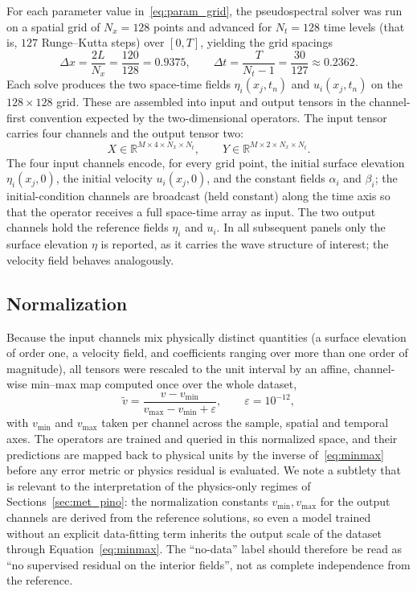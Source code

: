 For each parameter value in~\eqref{eq:param_grid}, the pseudospectral solver was run on a spatial grid of $N_x = 128$ points and advanced for $N_t = 128$ time levels (that is, $127$ Runge--Kutta steps) over $[0,T]$, yielding the grid spacings
\begin{equation}\label{eq:spacings}
    \Delta x = \frac{2L}{N_x} = \frac{120}{128} = 0.9375,
    \qquad
    \Delta t = \frac{T}{N_t - 1} = \frac{30}{127} \approx 0.2362.
\end{equation}
Each solve produces the two space-time fields $\eta_i(x_j, t_n)$ and $u_i(x_j, t_n)$ on the $128 \times 128$ grid. These are assembled into input and output tensors in the channel-first convention expected by the two-dimensional operators. The input tensor carries four channels and the output tensor two:
\begin{equation}\label{eq:tensor_shapes}
    X \in \mathbb{R}^{M \times 4 \times N_x \times N_t},
    \qquad
    Y \in \mathbb{R}^{M \times 2 \times N_x \times N_t}.
\end{equation}
The four input channels encode, for every grid point, the initial surface elevation $\eta_i(x_j, 0)$, the initial velocity $u_i(x_j, 0)$, and the constant fields $\alpha_i$ and $\beta_i$; the initial-condition channels are broadcast (held constant) along the time axis so that the operator receives a full space-time array as input. The two output channels hold the reference fields $\eta_i$ and $u_i$. In all subsequent panels only the surface elevation $\eta$ is reported, as it carries the wave structure of interest; the velocity field behaves analogously.

\subsection{Normalization}
\label{subsec:met_norm}

Because the input channels mix physically distinct quantities (a surface elevation of order one, a velocity field, and coefficients ranging over more than one order of magnitude), all tensors were rescaled to the unit interval by an affine, channel-wise min--max map computed once over the whole dataset,
\begin{equation}\label{eq:minmax}
    \tilde v = \frac{v - v_{\min}}{v_{\max} - v_{\min} + \varepsilon},
    \qquad \varepsilon = 10^{-12},
\end{equation}
with $v_{\min}$ and $v_{\max}$ taken per channel across the sample, spatial and temporal axes. The operators are trained and queried in this normalized space, and their predictions are mapped back to physical units by the inverse of~\eqref{eq:minmax} before any error metric or physics residual is evaluated. We note a subtlety that is relevant to the interpretation of the physics-only regimes of Sections~\ref{sec:met_pino}: the normalization constants $v_{\min}, v_{\max}$ for the output channels are derived from the reference solutions, so even a model trained without an explicit data-fitting term inherits the output scale of the dataset through Equation~\eqref{eq:minmax}. The ``no-data'' label should therefore be read as ``no supervised residual on the interior fields'', not as complete independence from the reference.


